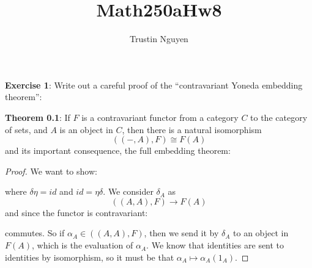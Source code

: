 \documentclass{article}
\title{Math250aHw8}
\author{Trustin Nguyen}
\begin{document}
    \maketitle

\reversemarginpar

\textbf{Exercise 1}: Write out a careful proof of the ``contravariant Yoneda embedding theorem'':

\hspace{15pt}\textbf{Theorem 0.1}: If $F$ is a contravariant functor from a category $C$ to the category of sets, and $A$ is an object in $C$, then there is a natural isomorphism
    \begin{equation*}
        ((-, A), F) \cong F(A)
    \end{equation*}
and its important consequence, the full embedding theorem:
    \begin{proof}
        We want to show: 
            \begin{center}
            \end{center}
        where $\delta\eta = id$ and $id = \eta\delta$. We consider $\delta_{A}$ as 
            \begin{equation*}
                ((A, A), F) \rightarrow F(A)
            \end{equation*}
        and since the functor is contravariant:
            \begin{center}
            \end{center}
        commutes. So if $\alpha_{A} \in ((A, A), F)$, then we send it by $\delta_{A}$ to an object in $F(A)$, which is the evaluation of $\alpha_{A}$. We know that identities are sent to identities by isomorphism, so it must be that $\alpha_{A} \mapsto \alpha_{A}(1_{A})$. 


\end{proof}
\end{document}
